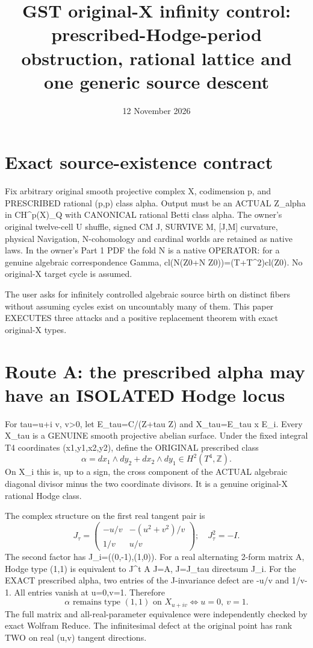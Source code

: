 \documentclass[11pt]{article}
\title{GST original-X infinity control: prescribed-Hodge-period obstruction, rational lattice and one generic source descent}
\date{12 November 2026}
\begin{document}
\maketitle
\section{Exact source-existence contract}
Fix arbitrary original smooth projective complex X, codimension p,
and PRESCRIBED rational (p,p) class alpha. Output must be an ACTUAL
Z_alpha in CH^p(X)_Q with CANONICAL rational Betti class alpha.
The owner's original twelve-cell U shuffle, signed CM J, SURVIVE M,
[J,M] curvature, physical Navigation, N-cohomology and cardinal worlds
are retained as native laws. In the owner's Part 1 PDF the fold
N is a native OPERATOR: for a genuine algebraic correspondence Gamma,
cl(N(Z0+N Z0))=(T+T^2)cl(Z0).
No original-X target cycle is assumed.

The user asks for infinitely controlled algebraic source birth on
distinct fibers without assuming cycles exist on uncountably many
of them. This paper EXECUTES three attacks and a positive replacement
theorem with exact original-X types.

\section{Route A: the prescribed alpha may have an ISOLATED Hodge locus}
For tau=u+i v, v>0, let E_tau=C/(Z+tau Z) and
X_tau=E_tau x E_i. Every X_tau is a GENUINE smooth projective
abelian surface. Under the fixed integral T4 coordinates
(x1,y1,x2,y2), define the ORIGINAL prescribed class
\[
\boxed{\alpha=dx_1\wedge dy_2+dx_2\wedge dy_1
\in H^2(T^4,\mathbb Z).}
\]
On X_i this is, up to a sign, the cross component of the
ACTUAL algebraic diagonal divisor minus the two coordinate divisors.
It is a genuine original-X rational Hodge class.

The complex structure on the first real tangent pair is
\[
J_\tau=\begin{pmatrix}
-u/v & -(u^2+v^2)/v\\
1/v & u/v
\end{pmatrix};
\quad J_\tau^2=-I.
\]
The second factor has J_i=((0,-1),(1,0)).
For a real alternating 2-form matrix A, Hodge type (1,1)
is equivalent to J^t A J=A, J=J_tau directsum J_i.
For the EXACT prescribed alpha, two entries of the
J-invariance defect are -u/v and 1/v-1.
All entries vanish at u=0,v=1. Therefore
\[
\boxed{
\alpha\text{ remains type }(1,1)\text{ on }X_{u+iv}
\iff u=0,\ v=1.}\tag{1}
\]
The full matrix and all-real-parameter equivalence were independently
checked by exact Wolfram Reduce. The infinitesimal defect at the
original point has rank TWO on real (u,v) tangent directions.
\end{document}
